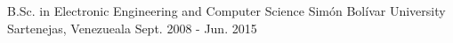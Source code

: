 \begin{cventries}
  \cventry
    {B.Sc. in Electronic Engineering and Computer Science}
    {Sim\'on Bol\'ivar University}
    {Sartenejas, Venezueala}
    {Sept. 2008 - Jun. 2015}{}
    \vspace*{-4mm}
\end{cventries}